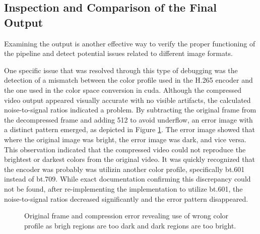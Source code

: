 \subsection{Inspection and Comparison of the Final Output}
\label{sec:inspection_and_comparison_of_the_final_output}
Examining the output is another effective way to verify the proper functioning of the pipeline and detect potential issues related to different image formats.

One specific issue that was resolved through this type of debugging was the detection of a mismatch between the color profile used in the H.265 encoder and the one used in the color space conversion in \gls{cuda}.
Although the compressed video output appeared visually accurate with no visible artifacts, the calculated noise-to-signal ratios indicated a problem.
By subtracting the original frame from the decompressed frame and adding 512 to avoid underflow, an error image with a distinct pattern emerged, as depicted in Figure \ref{fig:compression_error}.
The error image showed that where the original image was bright, the error image was dark, and vice versa.
This observation indicated that the compressed video could not reproduce the brightest or darkest colors from the original video.
It was quickly recognized that the encoder was probably was utilizin another color profile, specifically bt.601 instead of bt.709.
While exact documentation confirming this discrepancy could not be found, after re-implementing the \cuda implementation to utilize bt.601, the noise-to-signal ratios decreased significantly and the error pattern disappeared.

\begin{figure}
    \centering
    \caption{Original frame and compression error revealing use of wrong color profile as brigh regions are too dark and dark regions are too bright.}
    \label{fig:compression_error}
\end{figure}